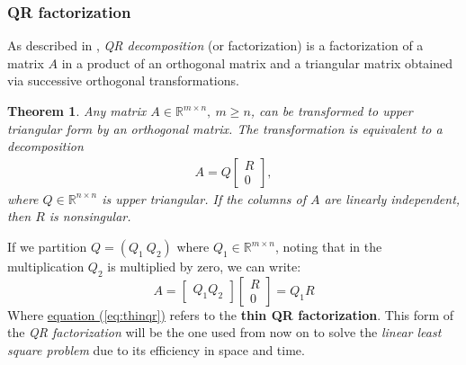 \subsubsection{QR factorization}
\label{subsec:qr}
As described in \parencite[Chap. 5]{elden}, \textit{QR decomposition} (or factorization) is a factorization of a matrix $A$ in a product of an orthogonal matrix and a triangular matrix obtained via successive orthogonal transformations.
\newtheorem{thm}{Theorem}[section]
\newtheorem{lemma}[thm]{Lemma}
\begin{thm}
\label{thm:qr}
Any matrix $A\in \mathbb{R}^{m\times n},\ m\geq n$, can be transformed to upper triangular form by an orthogonal matrix. The transformation is equivalent to a decomposition
\begin{align*}
    A = Q\begin{bmatrix}R \\ 0\end{bmatrix},
\end{align*} where $Q\in \mathbb{R}^{n\times n}$ is upper triangular. If the columns of $A$ are linearly independent, then $R$ is nonsingular.
\end{thm}
If we partition $Q = (Q_1\ Q_2)$ where $Q_1\in \mathbb{R}^{m\times n}$, noting that in the multiplication $Q_2$ is multiplied by zero, we can write:
\begin{equation}
\label{eq:thinqr}
    A = \begin{bmatrix}Q_1 Q_2\end{bmatrix}\begin{bmatrix}R \\ 0\end{bmatrix} = Q_1R
\end{equation}
Where \hyperref[eq:thinqr]{equation (\ref{eq:thinqr})} refers to the \textbf{thin QR factorization}. This form of the \textit{QR factorization} will be the one used from now on to solve the \textit{linear least square problem} due to its efficiency in space and time.


